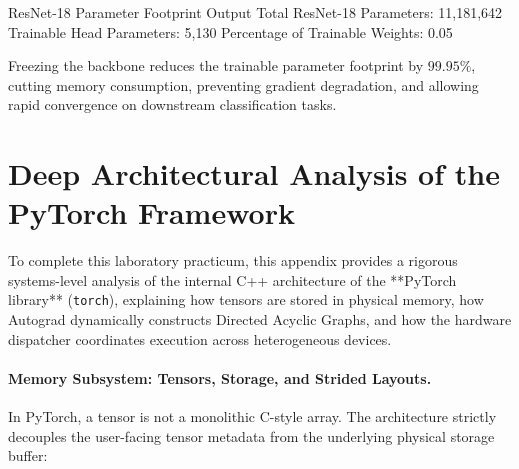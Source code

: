 \documentclass[11pt,a4paper]{article}
\begin{document}
\begin{macterminal}{ResNet-18 Parameter Footprint Output}
Total ResNet-18 Parameters:      11,181,642
Trainable Head Parameters:       5,130
Percentage of Trainable Weights: 0.05%
\end{macterminal}

Freezing the backbone reduces the trainable parameter footprint by $99.95\%$, cutting memory consumption, preventing gradient degradation, and allowing rapid convergence on downstream classification tasks.

\clearpage

\appendix
\section[Appendix: PyTorch Library Architecture]{Deep Architectural Analysis of the PyTorch Framework}
\label{sec:appendix_pytorch}

To complete this laboratory practicum, this appendix provides a rigorous systems-level analysis of the internal C++ architecture of the **PyTorch library** (\texttt{torch}), explaining how tensors are stored in physical memory, how Autograd dynamically constructs Directed Acyclic Graphs, and how the hardware dispatcher coordinates execution across heterogeneous devices.

\paragraph{Memory Subsystem: Tensors, Storage, and Strided Layouts.}
In PyTorch, a tensor is not a monolithic C-style array. The architecture strictly decouples the user-facing tensor metadata from the underlying physical storage buffer:
\end{document}
